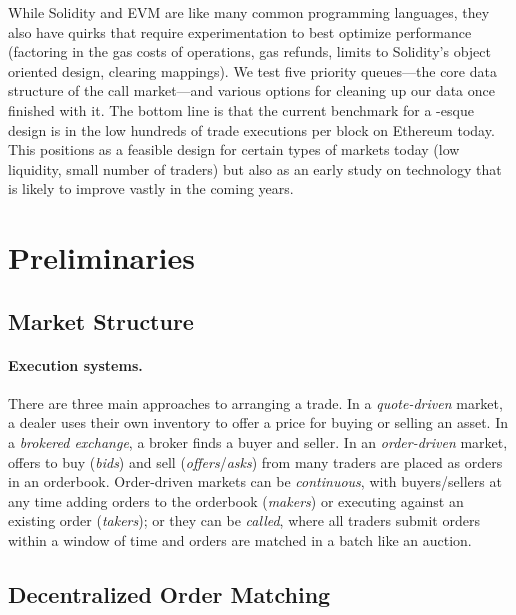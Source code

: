 While Solidity and EVM are like many common programming languages, they also have quirks that require experimentation to best optimize performance (\eg factoring in the gas costs of operations, gas refunds, limits to Solidity's object oriented design, clearing mappings). We test five priority queues---the core data structure of the call market---and various options for cleaning up our data once finished with it. The bottom line is that the current benchmark for a \cm-esque design is in the low hundreds of trade executions per block on Ethereum today. This positions \cm as a feasible design for certain types of markets today (low liquidity, small number of traders) but also as an early study on technology that is likely to improve vastly in the coming years. 


\section{Preliminaries}

\subsection{Market Structure}

\paragraph{Execution systems.} There are three main approaches to arranging a trade. In a \emph{quote-driven} market, a dealer uses their own inventory to offer a price for buying or selling an asset. In a \emph{brokered exchange}, a broker finds a buyer and seller. In an \emph{order-driven} market, offers to buy (\emph{bids}) and sell (\emph{offers}/\emph{asks}) from many traders are placed as orders in an orderbook. Order-driven markets can be \emph{continuous}, with buyers/sellers at any time adding orders to the orderbook (\emph{makers}) or executing against an existing order (\emph{takers}); or they can be \emph{called}, where all traders submit orders within a window of time and orders are matched in a batch like an auction. 

\subsection{Decentralized Order Matching}

